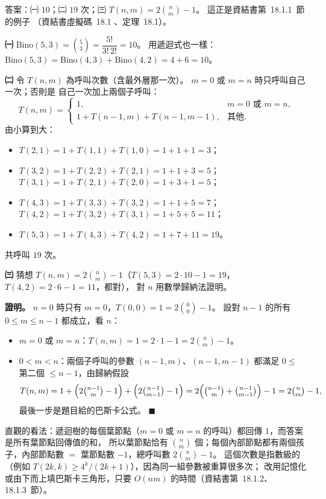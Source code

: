 \begin{pastsoln}
答案：㈠ $10$；㈡ $19$ 次；㈢ $T(n, m) = 2\binom{n}{m} - 1$。 這正是資結書第~18.1.1~節的例子
（資結書虛擬碼~18.1 、定理~18.1）。

\textbf{㈠} $\mathrm{Bino}(5,3) = \binom{5}{3} = \dfrac{5!}{3!\,2!} = 10$。 用遞迴式也一樣：
$\mathrm{Bino}(5,3) = \mathrm{Bino}(4,3) + \mathrm{Bino}(4,2) = 4 + 6 = 10$。

\textbf{㈡} 令 $T(n, m)$ 為呼叫次數（含最外層那一次）。 $m = 0$ 或 $m = n$ 時只呼叫自己一次；否則是
自己一次加上兩個子呼叫：
\[
T(n, m) = \begin{cases} 1, & m = 0 \text{ 或 } m = n, \\ 1 + T(n-1, m) + T(n-1, m-1), & \text{其他.} \end{cases}
\]
由小算到大：
\begin{itemize}
\item $T(2,1) = 1 + T(1,1) + T(1,0) = 1 + 1 + 1 = 3$；
\item $T(3,2) = 1 + T(2,2) + T(2,1) = 1 + 1 + 3 = 5$；$T(3,1) = 1 + T(2,1) + T(2,0) = 1 + 3 + 1 = 5$；
\item $T(4,3) = 1 + T(3,3) + T(3,2) = 1 + 1 + 5 = 7$；$T(4,2) = 1 + T(3,2) + T(3,1) = 1 + 5 + 5 = 11$；
\item $T(5,3) = 1 + T(4,3) + T(4,2) = 1 + 7 + 11 = 19$。
\end{itemize}
共呼叫 $19$ 次。

\textbf{㈢} 猜想 $T(n, m) = 2\binom{n}{m} - 1$（$T(5,3) = 2 \cdot 10 - 1 = 19$，$T(4,2) = 2 \cdot 6 - 1 = 11$，都對），
對 $n$ 用數學歸納法證明。

\textbf{證明。} $n = 0$ 時只有 $m = 0$，$T(0, 0) = 1 = 2\binom{0}{0} - 1$。 設對 $n - 1$ 的所有
$0 \le m \le n - 1$ 都成立，看 $n$：
\begin{itemize}
\item $m = 0$ 或 $m = n$：$T(n, m) = 1 = 2 \cdot 1 - 1 = 2\binom{n}{m} - 1$。
\item $0 < m < n$：兩個子呼叫的參數 $(n-1, m)$、$(n-1, m-1)$ 都滿足 $0 \le$ 第二個 $\le n - 1$，由歸納假設
\[
T(n, m) = 1 + \Bigl(2\tbinom{n-1}{m} - 1\Bigr) + \Bigl(2\tbinom{n-1}{m-1} - 1\Bigr)
= 2\Bigl(\tbinom{n-1}{m} + \tbinom{n-1}{m-1}\Bigr) - 1 = 2\tbinom{n}{m} - 1,
\]
最後一步是題目給的巴斯卡公式。 \hfill$\blacksquare$
\end{itemize}

直觀的看法：遞迴樹的每個葉節點（$m = 0$ 或 $m = n$ 的呼叫）都回傳 $1$，而答案是所有葉節點回傳值的和，
所以葉節點恰有 $\binom{n}{m}$ 個；每個內部節點都有兩個孩子，內部節點數 $=$ 葉節點數 $- 1$，總呼叫數
$2\binom{n}{m} - 1$。 這個次數是指數級的（例如 $T(2k, k) \ge 4^k/(2k+1)$），因為同一組參數被重算很多次；
改用記憶化或由下而上填巴斯卡三角形，只要 $O(nm)$ 的時間（資結書第~18.1.2、18.1.3~節）。
\end{pastsoln}
